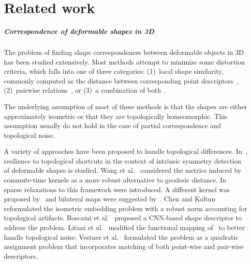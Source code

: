 \chapter{Related work}\label{chap:related work}

\paragraph{Correspondence of deformable shapes in 3D}
The problem of finding shape correspondences between deformable objects in 3D has been studied extensively.
Most methods attempt to minimize some distortion criteria, which falls into one of three categories:
(1)~local shape similarity, commonly computed as the distance between corresponding point descriptors~\cite{aubry2011wave,bronstein2010scale,jain2007non,rusu2008learning,rusu2009fast,Sun:2009:CPI:1735603.1735621,tombari2010unique,dey2010persistent}, 
(2)~pairwise relations~\cite{chen2015robust,coifman2005geometric,vestner2017product}, or
(3)~a combination of both~\cite{vestner2017efficient}.

The underlying assumption of most of these methods is that the shapes are either approximately isometric or that they are topologically homeomorphic.
This assumption usually do not hold in the case of partial correspondence and topological noise.

A variety of approaches have been proposed to handle topological differences.
In~\cite{ovsjanikov2008global}, resilience to topological shortcuts in the context of intrinsic
symmetry detection of deformable shapes is studied.
Wang et al.~\cite{wang2011discrete} considered the metrics induced by commute-time kernels as a more robust alternative to geodesic distance.
In~\cite{rodola2013elastic,Torsello:2012:GAD:2354409.2354702} sparse relaxations to this framework were introduced.
A different kernel was proposed by~\cite{boscaini2014coulomb} and bilateral maps were suggested by~\cite{vanKaick:2013:BMP:2771539.2771553}.
Chen and Koltun~\cite{chen2015robust} reformulated the isometric embedding problem with a robust norm accounting for topological artifacts.
Boscaini et al.~\cite{Boscaini2016AnisotropicDD} proposed a CNN-based shape descriptor to address the problem.
Litani et al.~\cite{litany2017fully} modified the functional mapping of~\cite{Ovsjanikov:2012:FMF:2185520.2185526} to better handle topological noise.
Vestner et al.~\cite{vestner2017efficient} formulated the problem as a quadratic assignment problem that incorporates matching of both point-wise and pair-wise descriptors.


